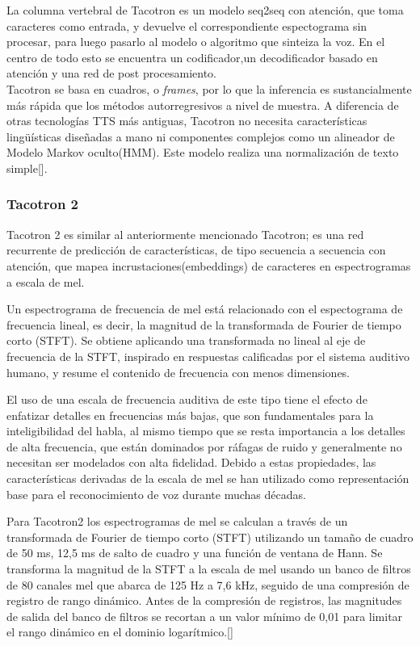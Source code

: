La columna vertebral de Tacotron es un modelo seq2seq con atención, que toma caracteres como entrada, y devuelve el correspondiente espectograma sin procesar, para luego pasarlo al modelo o algoritmo que sinteiza la voz. En el centro de todo esto se encuentra un codificador,un decodificador basado en atención y una red de post procesamiento.\\

Tacotron se basa en cuadros, o \textit{frames}, por lo que la inferencia es sustancialmente más rápida que los métodos autorregresivos a nivel de muestra. A diferencia de otras tecnologías TTS más antiguas, Tacotron no necesita características lingüísticas diseñadas a mano ni componentes complejos como un alineador de Modelo Markov oculto(HMM). Este modelo realiza una
normalización de texto simple[\cite{wang2017tacotron}].


\subsubsection{Tacotron 2}

Tacotron 2 es similar al anteriormente mencionado Tacotron; es una red recurrente de predicción de características, de tipo secuencia a secuencia con atención, que mapea incrustaciones(embeddings) de caracteres en espectrogramas a escala de mel. 

Un espectrograma de frecuencia de mel está relacionado con el espectograma de frecuencia lineal, es decir, la magnitud de la transformada de Fourier de tiempo corto (STFT). Se obtiene aplicando una transformada no lineal al eje de frecuencia de la STFT, inspirado en respuestas calificadas por el sistema auditivo humano, y resume el contenido de frecuencia con menos dimensiones.

El uso de una escala de frecuencia auditiva de este tipo tiene el efecto de enfatizar detalles en frecuencias más bajas, que son fundamentales para la inteligibilidad del habla, al mismo tiempo que se resta importancia a los detalles de alta frecuencia, que están dominados por ráfagas de ruido y generalmente no necesitan ser modelados con alta fidelidad. Debido a estas propiedades, las características derivadas de la escala de mel se han utilizado como representación base para el reconocimiento de voz durante muchas décadas. 

Para Tacotron2 los espectrogramas de mel se calculan a través de un transformada de Fourier de tiempo corto (STFT) utilizando un tamaño de cuadro de 50 ms, 12,5 ms de salto de cuadro y una función de ventana de Hann. Se transforma la magnitud de la STFT a la escala de mel usando un banco de filtros de 80 canales mel que abarca de 125 Hz a 7,6 kHz, seguido de una compresión de registro de rango dinámico. Antes de la compresión de registros, las magnitudes de salida del banco de filtros se recortan a un valor mínimo de 0,01 para limitar el rango dinámico en el dominio logarítmico.[\cite{shen2018natural}] \\

